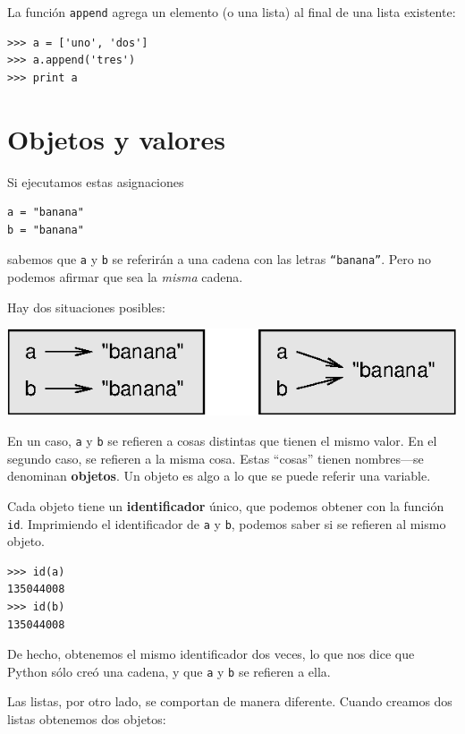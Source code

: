 La función \texttt{append} agrega un elemento (o una lista) al final
de una lista existente:

\beforeverb
\begin{verbatim}
>>> a = ['uno', 'dos']
>>> a.append('tres')
>>> print a

\end{verbatim}
\afterverb
%


\section{Objetos y valores}

Si ejecutamos estas asignaciones

\beforeverb
\begin{verbatim}
a = "banana"
b = "banana"
\end{verbatim}
\afterverb
%
sabemos que \texttt{a} y \texttt{b} se referirán a una cadena
con las letras \texttt{``banana''}.  Pero no podemos afirmar
que sea la  {\em misma} cadena.

Hay dos situaciones posibles:

\beforefig
\centerline{\includegraphics{illustrations/list1.eps}}
\afterfig

En un caso, \texttt{a} y \texttt{b} se refieren a cosas distintas que
tienen el mismo valor. En el segundo caso, se refieren a la 
misma cosa. Estas  ``cosas'' tienen nombres---se denominan {\bf objetos}.
Un objeto es algo a lo que se puede referir una variable.

Cada objeto tiene un  {\bf identificador} único, que podemos obtener con
la función  \texttt{id}.  Imprimiendo el identificador de \texttt{a} y \texttt{b}, 
podemos saber si se refieren al mismo objeto.

\beforeverb
\begin{verbatim}
>>> id(a)
135044008
>>> id(b)
135044008
\end{verbatim}
\afterverb
%
De hecho, obtenemos el mismo identificador dos veces, lo que nos dice
que Python sólo creó una cadena, y que  \texttt{a} y \texttt{b} se refieren
a ella.

Las listas, por otro lado, se comportan de manera diferente. Cuando
creamos dos listas obtenemos dos objetos:


